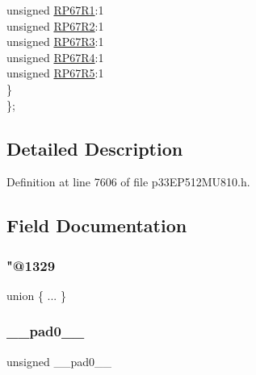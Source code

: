 \begin{DoxyCompactItemize}
\begin{tabbing}
\>\>unsigned \hyperlink{structtag_r_p_o_r1_b_i_t_s_a70e20f782a2ebcac020d7b82b6756de6}{RP67R1}:1\\
\>\>unsigned \hyperlink{structtag_r_p_o_r1_b_i_t_s_a060a6ab43012e790bcf46215b34df7fb}{RP67R2}:1\\
\>\>unsigned \hyperlink{structtag_r_p_o_r1_b_i_t_s_aa95b30694db41eec385d9b9fa95ee23a}{RP67R3}:1\\
\>\>unsigned \hyperlink{structtag_r_p_o_r1_b_i_t_s_a3a440bea44f733a17e99d4a162455ad3}{RP67R4}:1\\
\>\>unsigned \hyperlink{structtag_r_p_o_r1_b_i_t_s_a5e0222196702752abc55e0983dc2b414}{RP67R5}:1\\
\>\} \\
\}; \\

\end{tabbing}\end{DoxyCompactItemize}


\subsection{Detailed Description}


Definition at line 7606 of file p33\+E\+P512\+M\+U810.\+h.



\subsection{Field Documentation}
\mbox{\label{structtag_r_p_o_r1_b_i_t_s_a50ff3681a96f69e31bcdbe61bf3aea2d}} 
\subsubsection{\texorpdfstring{"@1329}{@1329}}
{\footnotesize\ttfamily union \{ ... \} }

\mbox{\label{structtag_r_p_o_r1_b_i_t_s_adf71f3d8410c1f1dbbc96680a92c49af}} 
\subsubsection{\texorpdfstring{\+\_\+\+\_\+pad0\+\_\+\+\_\+}{\_\_pad0\_\_}}
{\footnotesize\ttfamily unsigned \+\_\+\+\_\+pad0\+\_\+\+\_\+}



